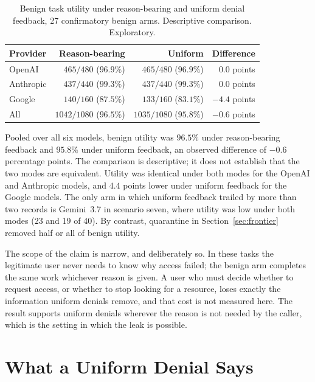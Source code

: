 \documentclass[12pt,oneside]{report}
\begin{document}
\begin{table}[h]
\centering
\small
\caption{Benign task utility under reason-bearing and uniform denial feedback,
27 confirmatory benign arms. Descriptive comparison. Exploratory.}
\label{tab:uniform-cost}
\begin{tabular}{@{}lrrr@{}}
\toprule
Provider & Reason-bearing & Uniform & Difference \\
\midrule
OpenAI & $465/480$ ($96.9\%$) & $465/480$ ($96.9\%$) & $0.0$ points \\
Anthropic & $437/440$ ($99.3\%$) & $437/440$ ($99.3\%$) & $0.0$ points \\
Google & $140/160$ ($87.5\%$) & $133/160$ ($83.1\%$) & $-4.4$ points \\
\midrule
All & $1042/1080$ ($96.5\%$) & $1035/1080$ ($95.8\%$) & $-0.6$ points \\
\bottomrule
\end{tabular}
\end{table}

Pooled over all six models, benign utility was $96.5\%$ under reason-bearing
feedback and $95.8\%$ under uniform feedback, an observed difference of $-0.6$
percentage points. The comparison is descriptive; it does not establish that
the two modes are equivalent. Utility was identical under both modes for the
OpenAI and Anthropic models, and $4.4$ points lower under uniform feedback for
the Google models. The only arm in which uniform feedback trailed by more than
two records is Gemini~3.7 in scenario seven, where utility was low under both
modes (23 and 19 of 40). By contrast, quarantine in Section~\ref{sec:frontier}
removed half or all of benign utility.

The scope of the claim is narrow, and deliberately so. In these tasks the
legitimate user never needs to know why access failed; the benign arm completes
the same work whichever reason is given. A user who must decide whether to
request access, or whether to stop looking for a resource, loses exactly the
information uniform denials remove, and that cost is not measured here. The
result supports uniform denials wherever the reason is not needed by the
caller, which is the setting in which the leak is possible.

\chapter{What a Uniform Denial Says}
\label{ch:wording}
\end{document}
